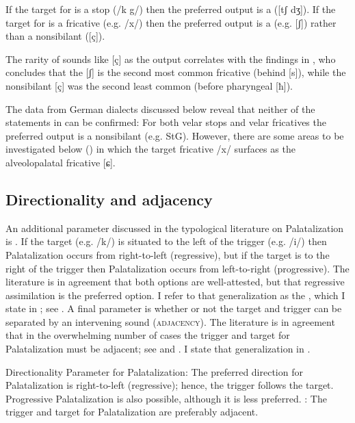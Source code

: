 \begin{xlist}
\begin{xlist}
\eanoraggedright%
    \label{ex:2:22}
\eanoraggedright
      If the target for  is a stop (/k g/) then the preferred output is a   ([tʃ dʒ]).
\ex   If the target for  is a fricative (e.g. /x/) then the preferred output is a  (e.g. [ʃ]) rather than a nonsibilant ([ç]).

\z 
\z

The rarity of sounds like [ç] as the output correlates with the findings in \citet[43--47]{Maddieson1984}, who concludes that the  [ʃ] is the second most common fricative (behind [s]), while the nonsibilant [ç] was the second least common (before pharyngeal [ħ]).

The data from German dialects discussed below reveal that neither of the statements in  can be confirmed: For both velar stops and velar fricatives the preferred output is a nonsibilant (e.g. StG). However, there are some areas to be investigated below () in which the target fricative /x/ surfaces as the  alveolopalatal fricative [ɕ].

\subsection{Directionality and adjacency}\label{sec:2.3.5}

An additional parameter discussed in the typological literature on Palatalization is . If the target (e.g. /k/) is situated to the left of the trigger (e.g. /i/) then Palatalization occurs from right-to-left (regressive), but if the target is to the right of the trigger then Palatalization occurs from left-to-right (progressive). The literature is in agreement that both options are well-attested, but that regressive assimilation is the preferred option. I refer to that generalization as the , which I state in ; see \citet[75--77]{Bateman2007}. A final parameter is whether or not the target and trigger can be separated by an intervening sound  (\textsc{adjacency}). The literature is in agreement that in the overwhelming number of cases the trigger and target for Palatalization must be adjacent; see \citet[75--77]{Bateman2007} and \citet{Kochetov2011}. I state that generalization in .

\eanoraggedright%
    \label{ex:2:23}
          Directionality Parameter for Palatalization: The preferred direction for Palatalization is right-to-left (regressive); hence, the trigger follows the target. Progressive Palatalization is also possible, although it is less preferred.
\ex%
    \label{ex:2:24}
          : The trigger and target for Palatalization are preferably adjacent.
\z


\end{xlist}
\end{xlist}
